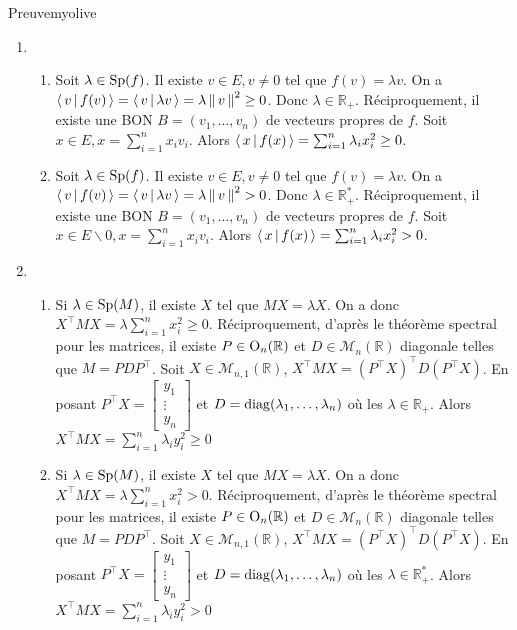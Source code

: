     \begin{demo}{Preuve}{myolive}
        \begin{enumerate}
            \item \begin{enumerate}
                \item Soit $\lambda \in \operatorname{Sp}(f)$. Il existe $v \in E, v \neq 0$ tel que $f(v) = \lambda v$. On a $\left<\,v\,\middle|\,f(v)\,\right> = \left<\,v\,\middle|\,\lambda v\,\right> = \lambda \left\lVert\,v\,\right\rVert^2 \geq 0$. Donc $\lambda \in \mathbb{R}_+$. Réciproquement, il existe une BON  $B = (v_1,\ldots,v_n)$ de vecteurs propres de $f$. Soit $x \in E, x = \sum_{i=1}^{n} x_i v_i$. Alors $\left<\,x\,\middle|\,f(x)\,\right> = \sum_{i=1}^{n} \lambda_i x_i^2 \geq 0$.
                \item Soit $\lambda \in \operatorname{Sp}(f)$. Il existe $v \in E, v \neq 0$ tel que $f(v) = \lambda v$. On a $\left<\,v\,\middle|\,f(v)\,\right> = \left<\,v\,\middle|\,\lambda v\,\right> = \lambda \left\lVert\,v\,\right\rVert^2 > 0$. Donc $\lambda \in \mathbb{R}_+^*$. Réciproquement, il existe une BON  $B = (v_1,\ldots,v_n)$ de vecteurs propres de $f$. Soit $x \in E \backslash {0}, x = \sum_{i=1}^{n} x_i v_i$. Alors $\left<\,x\,\middle|\,f(x)\,\right> = \sum_{i=1}^{n} \lambda_i x_i^2 > 0$.
            \end{enumerate}
            \item \begin{enumerate}
                \item Si $\lambda \in \operatorname{Sp}(M)$, il existe $X$ tel que $MX = \lambda X$. On a donc $X^{\top} M X = \lambda \sum_{i=1}^{n} x_i^2 \geq 0$. Réciproquement, d’après le théorème spectral pour les matrices, il existe $P \in \operatorname{O}_n(\mathbb{R})$ et $D \in \mathcal{M}_n(\mathbb{R})$ diagonale telles que $M = P D P^{\top}$. Soit $X \in \mathcal{M}_{n,1}(\mathbb{R})$, $X^{\top} M X = (P^{\top} X)^{\top} D (P^{\top} X)$. En posant $P^{\top} X = \begin{bmatrix}
                    y_1 \\
                    \vdots \\
                    y_n
                \end{bmatrix}$ et $D = \operatorname{diag}(\lambda_1,\ldots,\lambda_n)$ où les $\lambda \in \mathbb{R}_+$. Alors $X^{\top} M X = \sum_{i=1}^{n} \lambda_i y_i^2 \geq 0$
                \item Si $\lambda \in \operatorname{Sp}(M)$, il existe $X$ tel que $MX = \lambda X$. On a donc $X^{\top} M X = \lambda \sum_{i=1}^{n} x_i^2 > 0$. Réciproquement, d’après le théorème spectral pour les matrices, il existe $P \in \operatorname{O}_n(\mathbb{R})$ et $D \in \mathcal{M}_n(\mathbb{R})$ diagonale telles que $M = P D P^{\top}$. Soit $X \in \mathcal{M}_{n,1}(\mathbb{R})$, $X^{\top} M X = (P^{\top} X)^{\top} D (P^{\top} X)$. En posant $P^{\top} X = \begin{bmatrix}
                    y_1 \\
                    \vdots \\
                    y_n
                \end{bmatrix}$ et $D = \operatorname{diag}(\lambda_1,\ldots,\lambda_n)$ où les $\lambda \in \mathbb{R}_+^*$. Alors $X^{\top} M X = \sum_{i=1}^{n} \lambda_i y_i^2 > 0$
            \end{enumerate}
        \end{enumerate}
    \end{demo}

